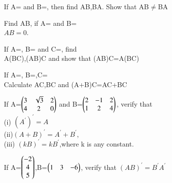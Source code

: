    
     \item If A= and  B=, then find AB,BA. Show that AB$\neq$BA\\
     
   
    \item Find AB, if A= and B=\\
    \solution $AB = 0$.

     
   
    \item If A=, B= and C=, find\\A(BC),(AB)C and show that (AB)C=A(BC) \\   
    
     \item If A=, B=,C=\\Calculate AC,BC and (A+B)C=AC+BC\\
     \solution
     

    
    

\item If A=$\begin{pmatrix}3 &\sqrt{3} &2\\4 &2 &0\end{pmatrix}$ and B=$\begin{pmatrix}2 &-1 &2\\1 &2 &4\end{pmatrix}$, verify that\\
(i) $(A^{'})^{'}=A$\\ (ii)$(A+B)^{'}=A^{'}+B^{'}$,\\ (iii) $(kB)^{'}=kB^{'}$,where k is any constant.\\
\item If A=$\begin{pmatrix}-2\\4 \\5\end{pmatrix}$,B=$\begin{pmatrix}1 &3 &-6\end{pmatrix}$, verify that $(AB)^{'}=B^{'}A^{'}$\\
  
